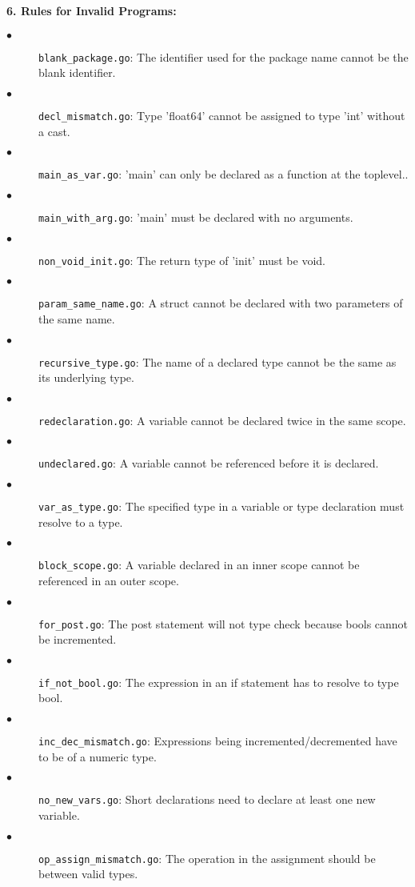 \documentclass{article}
\begin{document}
\paragraph{6. Rules for Invalid Programs:}\mbox{}
\begin{description}
\item[$\bullet$] \texttt{blank\_package.go}: The identifier used for the package name cannot be the blank identifier.
\item[$\bullet$] \texttt{decl\_mismatch.go}: Type 'float64' cannot be assigned to type 'int' without a cast.
\item[$\bullet$] \texttt{main\_as\_var.go}: 'main' can only be declared as a function at the toplevel..
\item[$\bullet$] \texttt{main\_with\_arg.go}: 'main' must be declared with no arguments.
\item[$\bullet$] \texttt{non\_void\_init.go}: The return type of 'init' must be void.
\item[$\bullet$] \texttt{param\_same\_name.go}: A struct cannot be declared with two parameters of the same name.
\item[$\bullet$] \texttt{recursive\_type.go}: The name of a declared type cannot be the same as its underlying type.
\item[$\bullet$] \texttt{redeclaration.go}: A variable cannot be declared twice in the same scope.
\item[$\bullet$] \texttt{undeclared.go}: A variable cannot be referenced before it is declared.
\item[$\bullet$] \texttt{var\_as\_type.go}: The specified type in a variable or type declaration must resolve to a type.
\item[$\bullet$] \texttt{block\_scope.go}: A variable declared in an inner scope cannot be referenced in an outer scope.
\item[$\bullet$] \texttt{for\_post.go}: The post statement will not type check because bools cannot be incremented.
\item[$\bullet$] \texttt{if\_not\_bool.go}: The expression in an if statement has to resolve to type bool.
\item[$\bullet$] \texttt{inc\_dec\_mismatch.go}: Expressions being incremented/decremented have to be of a numeric type.
\item[$\bullet$] \texttt{no\_new\_vars.go}: Short declarations need to declare at least one new variable.
\item[$\bullet$] \texttt{op\_assign\_mismatch.go}: The operation in the assignment should be between valid types.

\end{description}
\end{document}
